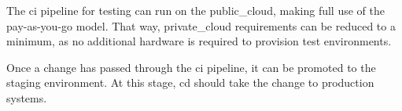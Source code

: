 \documentclass[../main.tex]{subfiles}
\begin{document}
    

    The \acrshort{ci} pipeline for testing can run on the \gls{public_cloud}, making full use of the pay-as-you-go model.
    That way, \gls{private_cloud} requirements can be reduced to a minimum, as no additional hardware is required to provision test environments.

    Once a change has passed through the \acrshort{ci} pipeline, it can be promoted to the staging environment.
    At this stage, \acrlong{cd} should take the change to production systems.
\end{document}
